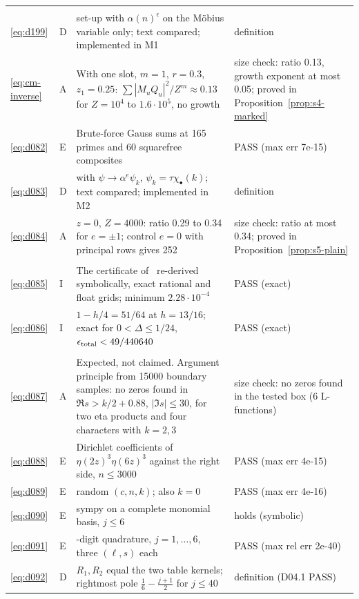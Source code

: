 \documentclass[11pt]{article}
\numberwithin{equation}{section}
\begin{document}
\begin{longtable}{@{}>{\raggedright\arraybackslash}p{1.2cm}>{\centering\arraybackslash}p{0.7cm}>{\raggedright\arraybackslash}p{9.05cm}>{\raggedright\arraybackslash}p{4.3cm}@{}}
\multicolumn{4}{@{}l}{\emph{Section~14}}\\
\eqref{eq:d199} & D & \cite[Lemma~17.1]{OAI78} set-up with $\alpha(n)^\epsilon$ on the M\"obius variable only; text compared; implemented in M1 & definition\\
\eqref{eq:cm-inverse} & A & With one slot, $m=1$, $r=0.3$, $z_1=0.25$: $\sum|M_uQ_u|^2/Z^m\approx0.13$ for $Z=10^4$ to $1.6\cdot10^5$, no growth & size check: ratio 0.13, growth exponent at most 0.05; proved in Proposition~\ref{prop:s4-marked}\\
\eqref{eq:d082} & E & Brute-force Gauss sums at 165 primes and 60 squarefree composites & PASS (max err 7e-15)\\
\eqref{eq:d083} & D & \cite[eq.~(4.1)]{OAI78} with $\psi\to\alpha^e\psi_k$, $\psi_k=\tau\chi_\bullet(k)$; text compared; implemented in M2 & definition\\
\eqref{eq:d084} & A & $z=0$, $Z=4000$: ratio 0.29 to 0.34 for $e=\pm1$; control $e=0$ with principal rows gives 252 & size check: ratio at most 0.34; proved in Proposition~\ref{prop:s5-plain}\\
\multicolumn{4}{@{}l}{\emph{Section~15}}\\
\eqref{eq:d085} & I & The certificate of~\cite{OAI78} re-derived symbolically, exact rational and float grids; minimum $2.28\cdot10^{-4}$ & PASS (exact)\\
\eqref{eq:d086} & I & $1-h/4=51/64$ at $h=13/16$; exact for $0<\Delta\le1/24$, $\epsilon_{\rm total}<49/440640$ & PASS (exact)\\
\multicolumn{4}{@{}l}{\emph{Section~17}}\\
\eqref{eq:d087} & A & Expected, not claimed. Argument principle from 15000 boundary samples: no zeros found in $\Re s>k/2+0.88$, $|\Im s|\le30$, for two eta products and four characters with $k=2,3$ & size check: no zeros found in the tested box (6 L-functions)\\
\eqref{eq:d088} & E & Dirichlet coefficients of $\eta(2z)^3\eta(6z)^3$ against the right side, $n\le3000$ & PASS (max err 4e-15)\\
\eqref{eq:d089} & E & 60 random $(c,n,k)$; also $k=0$ & PASS (max err 4e-16)\\
\eqref{eq:d090} & E & sympy on a complete monomial basis, $j\le6$ & holds (symbolic)\\
\eqref{eq:d091} & E & 40-digit quadrature, $j=1,\dots,6$, three $(\ell,s)$ each & PASS (max rel err 2e-40)\\
\eqref{eq:d092} & D & $R_1,R_2$ equal the two table kernels; rightmost pole $\frac16-\frac{j+1}2$ for $j\le40$ & definition (D04.1 PASS)\\

\end{longtable}
\end{document}
